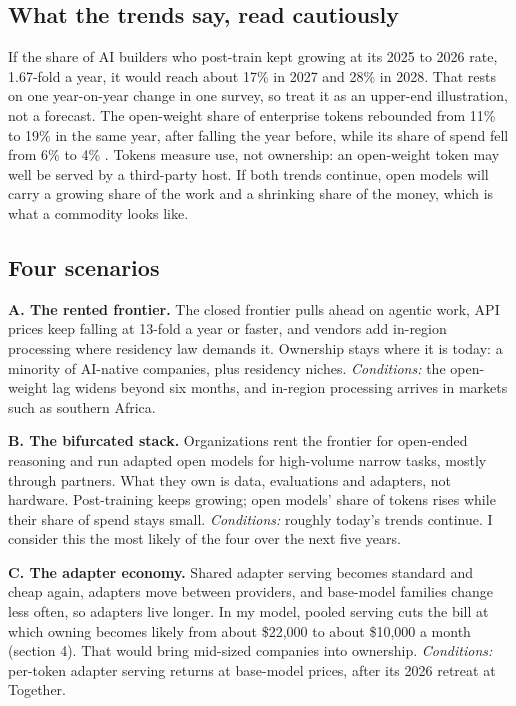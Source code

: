\subsection{What the trends say, read cautiously}

 If the share of AI builders who post-train kept growing at its 2025 to 2026 rate, 1.67-fold a year, it would reach about 17\% in 2027 and 28\% in 2028. That rests on one year-on-year change in one survey, so treat it as an upper-end illustration, not a forecast. The open-weight share of enterprise tokens rebounded from 11\% to 19\% in the same year, after falling the year before, while its share of spend fell from 6\% to 4\% \citep{menlo2026}. Tokens measure use, not ownership: an open-weight token may well be served by a third-party host. If both trends continue, open models will carry a growing share of the work and a shrinking share of the money, which is what a commodity looks like.

\subsection{Four scenarios}

\textbf{A. The rented frontier.} The closed frontier pulls ahead on agentic work, API prices keep falling at 13-fold a year or faster, and vendors add in-region processing where residency law demands it. Ownership stays where it is today: a minority of AI-native companies, plus residency niches. \emph{Conditions:} the open-weight lag widens beyond six months, and in-region processing arrives in markets such as southern Africa.

\textbf{B. The bifurcated stack.} Organizations rent the frontier for open-ended reasoning and run adapted open models for high-volume narrow tasks, mostly through partners. What they own is data, evaluations and adapters, not hardware. Post-training keeps growing; open models' share of tokens rises while their share of spend stays small. \emph{Conditions:} roughly today's trends continue.  I consider this the most likely of the four over the next five years.

\textbf{C. The adapter economy.} Shared adapter serving becomes standard and cheap again, adapters move between providers, and base-model families change less often, so adapters live longer. In my model, pooled serving cuts the bill at which owning becomes likely from about \$22,000 to about \$10,000 a month (section 4). That would bring mid-sized companies into ownership. \emph{Conditions:} per-token adapter serving returns at base-model prices, after its 2026 retreat at Together.

